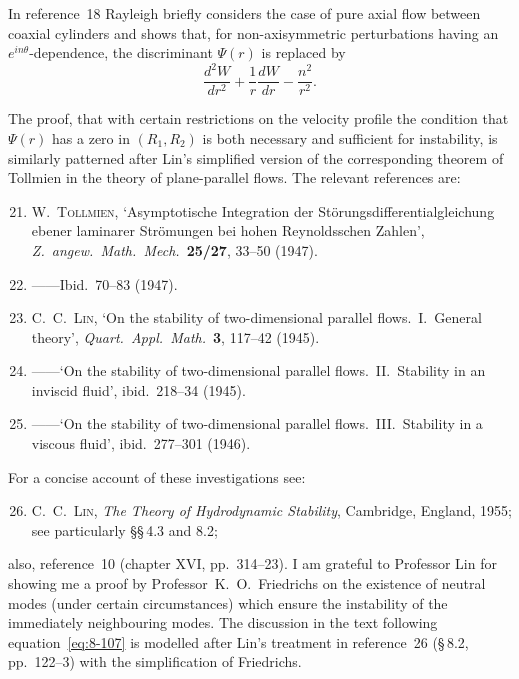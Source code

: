 In reference~18 Rayleigh briefly considers the case of pure axial flow between coaxial cylinders and shows that, for non-axisymmetric perturbations having an $e^{in\theta}$-dependence, the discriminant $\Psi(r)$ is replaced by
\[
\frac{d^2W}{dr^2} + \frac{1}{r}\frac{dW}{dr} - \frac{n^2}{r^2}.
\]

The proof, that with certain restrictions on the velocity profile the condition that $\Psi(r)$ has a zero in $(R_1, R_2)$ is both necessary and sufficient for instability, is similarly patterned after Lin's simplified version of the corresponding theorem of Tollmien in the theory of plane-parallel flows. The relevant references are:

\begin{enumerate}\setcounter{enumi}{20}
\item W.~\textsc{Tollmien}, `Asymptotische Integration der St\"orungs\-differentialgleichung ebener laminarer Str\"omungen bei hohen Reynoldsschen Zahlen', \emph{Z.\ angew.\ Math.\ Mech.}\ \textbf{25/27}, 33--50 (1947).

\item ------\quad Ibid.\ 70--83 (1947).

\item C.~C.~\textsc{Lin}, `On the stability of two-dimensional parallel flows.\ I.\ General theory', \emph{Quart.\ Appl.\ Math.}\ \textbf{3}, 117--42 (1945).

\item ------\quad `On the stability of two-dimensional parallel flows.\ II.\ Stability in an inviscid fluid', ibid.\ 218--34 (1945).

\item ------\quad `On the stability of two-dimensional parallel flows.\ III.\ Stability in a viscous fluid', ibid.\ 277--301 (1946).
\end{enumerate}

\noindent For a concise account of these investigations see:

\begin{enumerate}\setcounter{enumi}{25}
\item C.~C.~\textsc{Lin}, \emph{The Theory of Hydrodynamic Stability}, Cambridge, England, 1955; see particularly \S\S\,4.3 and 8.2;
\end{enumerate}
also, reference~10 (chapter XVI, pp.~314--23). I am grateful to Professor Lin for showing me a proof by Professor~K.~O.~Friedrichs on the existence of neutral modes (under certain circumstances) which ensure the instability of the immediately neighbouring modes. The discussion in the text following equation~\eqref{eq:8-107} is modelled after Lin's treatment in reference~26 (\S\,8.2, pp.~122--3) with the simplification of Friedrichs.

